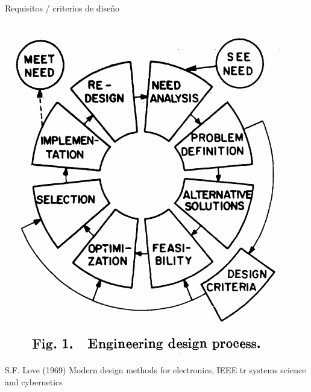 \documentclass[presentation,aspectratio=169]{beamer}
\begin{document}
\begin{frame}[label={sec:org2b562a9}]{Requisitos / criterios de diseño}
 \begin{center}
\includegraphics[height=0.6\textheight]{../../figures/design-process-fig1.png}\\
{\footnotesize  S.F. Love (1969) Modern design methods for electronics,  IEEE tr systems science and cybernetics}
\end{center}
\end{frame}
\end{document}
